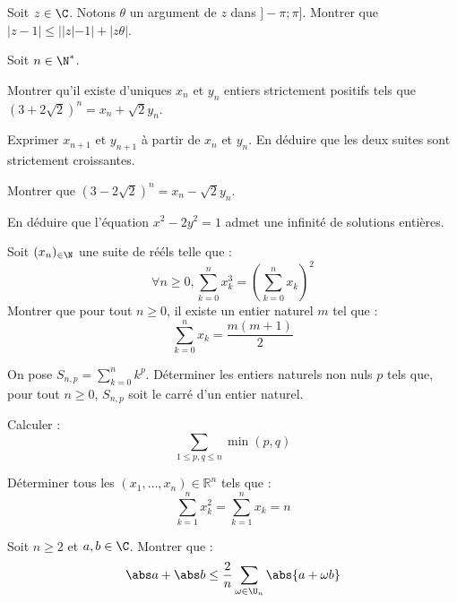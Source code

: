 \documentclass[11pt,a4paper]{article}
\begin{document}
\begin{exercise}
Soit $z\in \C$. Notons $\theta$ un argument de $z$ dans $]-\pi; \pi]$.
Montrer que $|z-1|\le ||z|-1|+|z\theta|$.
\end{exercise}

\begin{exercise}
Soit $n\in\N^*$.
\begin{questions}
\item Montrer qu'il existe d'uniques $x_n$ et $y_n$ entiers strictement positifs tels que $(3+2\sqrt{2})^n=x_n+\sqrt{2}y_n$.
\item Exprimer $x_{n+1}$ et $y_{n+1}$ à partir de $x_{n}$ et $y_{n}$. En déduire que les deux suites sont strictement croissantes.
\item Montrer que $(3-2\sqrt{2})^n=x_n-\sqrt{2}y_n$.
\item En déduire que l'équation $x^2-2y^2=1$ admet une infinité de solutions entières.
\end{questions}
\end{exercise}

\begin{exercise}
\begin{questions}
\item Soit $(x_n)_{\in\N}$ une suite de rééls telle que : $$\forall n \ge0, \sum_{k=0}^nx_k^3=\left(\sum_{k=0}^nx_k\right)^2$$
Montrer que pour tout $n\ge0$, il existe un entier naturel $m$ tel que : $$\sum_{k=0}^nx_k=\frac{m(m+1)}{2}$$
\item On pose $S_{n,p}=\displaystyle\sum_{k=0}^nk^p$. Déterminer les entiers naturels non nuls $p$ tels que, pour tout $n\ge0$, $S_{n,p}$ soit le carré d'un entier naturel.
\end{questions}
\end{exercise}

\begin{exercise}
Calculer :
$$
\sum_{1 \leq p, q \leq n} \min(p,q)
$$
\end{exercise}

\begin{exercise}
Déterminer tous les $(x_1, \dots, x_n) \in \mathbb R^n$ tels que :
$$
\sum_{k=1}^n x_k^2 = \sum_{k=1}^n x_k = n
$$
\end{exercise}

\begin{exercise}
Soit $n \geq 2$ et $a,b \in \C$. Montrer que :
$$
\abs a + \abs b \leq \frac 2 n \sum_{\omega \in \U_n} \abs{a + \omega b}
$$
\end{exercise}
\end{document}
